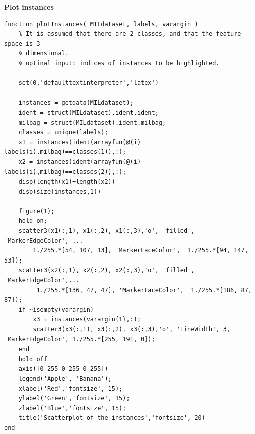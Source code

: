 \documentclass [a4paper] {report}
\begin{document}
	\newpage
	\noindent
	\textbf{Plot instances}
	\begin{lstlisting}
function plotInstances( MILdataset, labels, varargin )
	% It is assumed that there are 2 classes, and that the feature space is 3
	% dimensional.
	% optinal input: indices of instances to be highlighted.
	
	set(0,'defaulttextinterpreter','latex')
	
	instances = getdata(MILdataset);
	ident = struct(MILdataset).ident.ident;
	milbag = struct(MILdataset).ident.milbag;
	classes = unique(labels);
	x1 = instances(ident(arrayfun(@(i) labels(i),milbag)==classes(1)),:);
	x2 = instances(ident(arrayfun(@(i) labels(i),milbag)==classes(2)),:);
	disp(length(x1)+length(x2))
	disp(size(instances,1))
	
	figure(1);
	hold on;
	scatter3(x1(:,1), x1(:,2), x1(:,3),'o', 'filled', 'MarkerEdgeColor', ...
		1./255.*[54, 107, 13], 'MarkerFaceColor',  1./255.*[94, 147, 53]);
	scatter3(x2(:,1), x2(:,2), x2(:,3),'o', 'filled', 'MarkerEdgeColor',...
		 1./255.*[136, 47, 47], 'MarkerFaceColor',  1./255.*[186, 87, 87]);
	if ~isempty(varargin)
		x3 = instances(varargin{1},:); 
		scatter3(x3(:,1), x3(:,2), x3(:,3),'o', 'LineWidth', 3, 'MarkerEdgeColor', 1./255.*[255, 191, 0]);
	end
	hold off
	axis([0 255 0 255 0 255])
	legend('Apple', 'Banana');
	xlabel('Red','fontsize', 15);
	ylabel('Green','fontsize', 15);
	zlabel('Blue','fontsize', 15);
	title('Scatterplot of the instances','fontsize', 20)
end
	\end{lstlisting}
	
		
\end{document}
